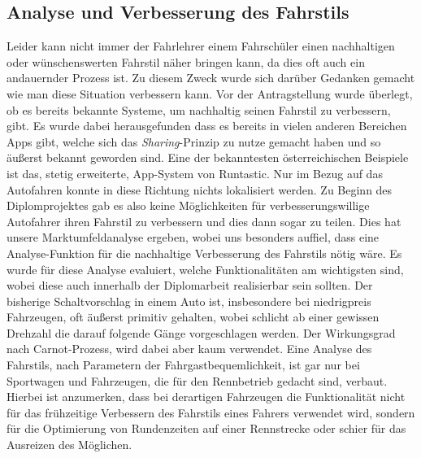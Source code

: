 \subsection{Analyse und Verbesserung des Fahrstils}
Leider kann nicht immer der Fahrlehrer einem Fahrschüler einen nachhaltigen oder wünschenswerten Fahrstil näher bringen kann, da dies oft auch ein andauernder Prozess ist. Zu diesem Zweck wurde sich darüber Gedanken gemacht wie man diese Situation verbessern kann.
\newline
\newline
Vor der Antragstellung wurde überlegt, ob es bereits bekannte Systeme, um nachhaltig seinen Fahrstil zu verbessern, gibt. Es wurde dabei herausgefunden dass es bereits in vielen anderen Bereichen Apps gibt, welche sich das \textit{Sharing}-Prinzip zu nutze gemacht haben und so äußerst bekannt geworden sind. Eine der bekanntesten österreichischen Beispiele ist das, stetig erweiterte, App-System von Runtastic. \cite{Businessplan.Runtastic}
Nur im Bezug auf das Autofahren konnte in diese Richtung nichts lokalisiert werden.
\newline
Zu Beginn des Diplomprojektes gab es also keine Möglichkeiten für verbesserungswillige Autofahrer ihren Fahrstil zu verbessern und dies dann sogar zu teilen. 
Dies hat unsere Marktumfeldanalyse ergeben, wobei uns besonders auffiel, dass eine Analyse-Funktion für die nachhaltige Verbesserung des Fahrstils nötig wäre. Es wurde für diese Analyse evaluiert, welche Funktionalitäten am wichtigsten sind, wobei diese auch innerhalb der Diplomarbeit realisierbar sein sollten.
\newline
\newline
Der bisherige Schaltvorschlag in einem Auto ist, insbesondere bei niedrigpreis Fahrzeugen, oft äußerst primitiv gehalten, wobei schlicht ab einer gewissen Drehzahl die darauf folgende Gänge vorgeschlagen werden. Der Wirkungsgrad nach Carnot-Prozess, wird dabei aber kaum verwendet. \cite{Carnot.Wirkungsgrad}
\newline
\newline
Eine Analyse des Fahrstils, nach Parametern der Fahrgastbequemlichkeit, ist gar nur bei Sportwagen und Fahrzeugen, die für den Rennbetrieb gedacht sind, verbaut. Hierbei ist anzumerken, dass bei derartigen Fahrzeugen die Funktionalität nicht für das frühzeitige Verbessern des Fahrstils eines Fahrers verwendet wird, sondern für die Optimierung von Rundenzeiten auf einer Rennstrecke oder schier für das Ausreizen des Möglichen.
\newline
